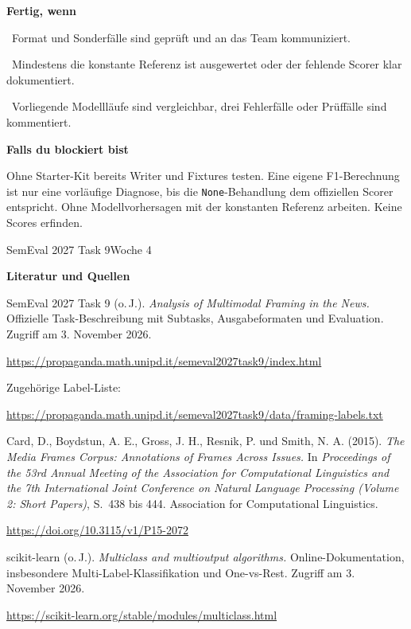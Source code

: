 \documentclass[10pt,a4paper]{article}
\renewcommand{\normalsize}{\fontsize{9.5}{12}\selectfont}
\newcommand{\checkbox}{\fbox{\rule{0pt}{2.4mm}\hspace{2.4mm}}}
\newcommand{\planheading}[1]{\par\vspace{9pt}\textbf{#1}\par\vspace{3pt}}
\newcommand{\followuptitle}[1]{%
  {\small SemEval 2027 Task 9\hfill Woche 4\par}%
  \vspace{6pt}%
  {\fontsize{16}{19}\selectfont\bfseries #1\par}%
  \vspace{8pt}%
}
\begin{document}
\planheading{Fertig, wenn}
\checkbox\ Format und Sonderfälle sind geprüft und an das Team kommuniziert.\par
\checkbox\ Mindestens die konstante Referenz ist ausgewertet oder der fehlende Scorer klar dokumentiert.\par
\checkbox\ Vorliegende Modellläufe sind vergleichbar, drei Fehlerfälle oder Prüffälle sind kommentiert.

\planheading{Falls du blockiert bist}
Ohne Starter-Kit bereits Writer und Fixtures testen. Eine eigene F1-Berechnung ist nur eine
vorläufige Diagnose, bis die \texttt{None}-Behandlung dem offiziellen Scorer entspricht.
Ohne Modellvorhersagen mit der konstanten Referenz arbeiten. Keine Scores erfinden.

\newpage
\normalsize
\followuptitle{Literatur und Quellen}
\begin{description}[font=\normalfont,leftmargin=8mm,labelwidth=6mm,labelsep=2mm,
  itemsep=12pt,parsep=3pt,topsep=8pt]
  \item[{[1]}] \hypertarget{quelle-task}{}SemEval 2027 Task 9 (o.\,J.).
    \textit{Analysis of Multimodal Framing in the News.}
    Offizielle Task-Beschreibung mit Subtasks, Ausgabeformaten und Evaluation.
    Zugriff am 3. November 2026.\par
    {\small\url{https://propaganda.math.unipd.it/semeval2027task9/index.html}}\par
    Zugehörige Label-Liste:\par
    {\small\url{https://propaganda.math.unipd.it/semeval2027task9/data/framing-labels.txt}}
  \item[{[2]}] \hypertarget{quelle-card}{}Card, D., Boydstun, A. E., Gross, J. H., Resnik, P. und Smith, N. A. (2015).
    \textit{The Media Frames Corpus: Annotations of Frames Across Issues.}
    In \textit{Proceedings of the 53rd Annual Meeting of the Association for Computational
    Linguistics and the 7th International Joint Conference on Natural Language Processing
    (Volume 2: Short Papers)}, S.\ 438 bis 444.
    Association for Computational Linguistics.\par
    {\small\url{https://doi.org/10.3115/v1/P15-2072}}
  \item[{[3]}] \hypertarget{quelle-sklearn}{}scikit-learn (o.\,J.).
    \textit{Multiclass and multioutput algorithms.}
    Online-Dokumentation, insbesondere Multi-Label-Klassifikation und One-vs-Rest.
    Zugriff am 3. November 2026.\par
    {\small\url{https://scikit-learn.org/stable/modules/multiclass.html}}

\end{description}
\end{document}
